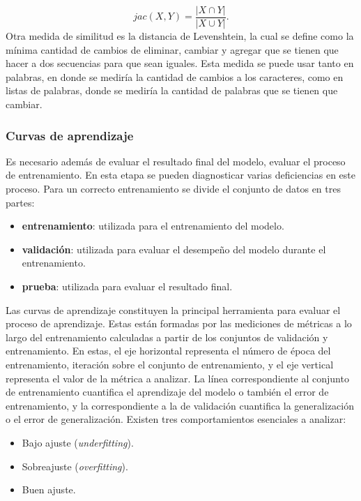 \begin{equation}
	jac(X, Y) = \frac{|X \cap Y|}{|X \cup Y|}.
\end{equation}
Otra medida de similitud es la distancia de Levenshtein, la cual se define como la mínima cantidad 
de cambios de eliminar, cambiar y agregar que se tienen que hacer a dos secuencias para que sean 
iguales. Esta medida se puede usar tanto en palabras, en donde se mediría la cantidad de cambios 
a los caracteres, como en listas de palabras, donde se mediría la cantidad de palabras que 
se tienen que cambiar. 

\subsubsection{Curvas de aprendizaje}

Es necesario además de evaluar el resultado final del modelo, evaluar el proceso de entrenamiento. En esta etapa 
se pueden diagnosticar varias deficiencias en este proceso. Para un correcto entrenamiento se divide el conjunto de 
datos en tres partes:

\begin{itemize}
	\item \textbf{entrenamiento}: utilizada para el entrenamiento del modelo.
	\item \textbf{validación}: utilizada para evaluar el desempeño del modelo durante el entrenamiento.
	\item \textbf{prueba}: utilizada para evaluar el resultado final.
\end{itemize}

Las curvas de aprendizaje constituyen la principal herramienta para evaluar el proceso de aprendizaje.
Estas están formadas por las mediciones de métricas a lo largo del entrenamiento calculadas a partir de 
los conjuntos de validación y entrenamiento. En estas, el eje horizontal representa el número de época del entrenamiento,
iteración sobre el conjunto de entrenamiento, y el eje vertical representa el valor de la métrica a analizar. 
La línea correspondiente al conjunto de entrenamiento cuantifica 
el aprendizaje del modelo o también el error de entrenamiento, y la correspondiente a la de validación cuantifica 
la generalización o el error de generalización. Existen tres comportamientos esenciales a analizar:

\begin{itemize}
	\item Bajo ajuste (\emph{underfitting}).
	\item Sobreajuste (\emph{overfitting}).
	\item Buen ajuste.
\end{itemize}

